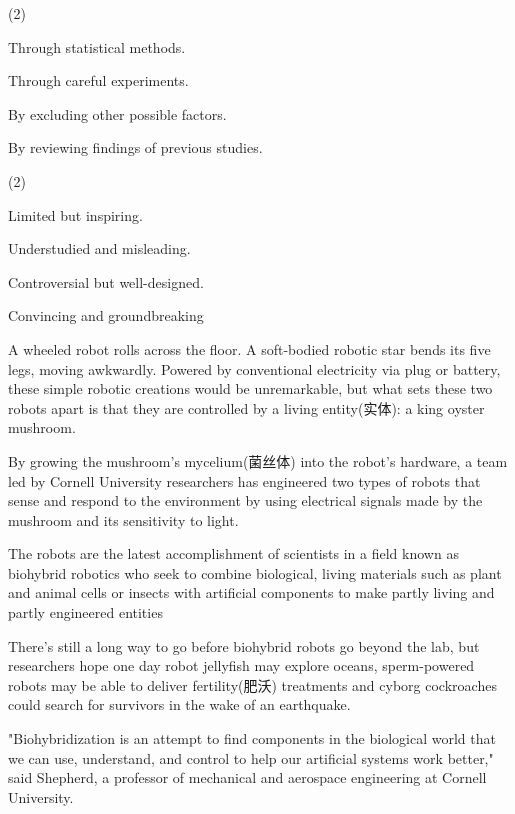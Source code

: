 \documentclass{英语试卷}
\begin{document}
\begin{choices}(2)
  \item Through statistical methods.
  \item Through careful experiments.
  \item By excluding other possible factors.
  \item By reviewing findings of previous studies.
\end{choices}
\begin{choices}(2)
  \item Limited but inspiring.
  \item Understudied and misleading.
  \item Controversial but well-designed.
  \item Convincing and groundbreaking
\end{choices}
\par A wheeled robot rolls across the floor. A soft-bodied robotic star bends its five legs, moving awkwardly. Powered by conventional electricity via plug or battery, these simple robotic creations would be unremarkable, but what sets these two robots apart is that they are controlled by a living entity(实体): a king oyster mushroom.\par
\par By growing the mushroom's mycelium(菌丝体) into the robot's hardware, a team led by Cornell University researchers has engineered two types of robots that sense and respond to the environment by using electrical signals made by the mushroom and its sensitivity to light.\par
\par The robots are the latest accomplishment of scientists in a field known as biohybrid robotics who seek to combine biological, living materials such as plant and animal cells or insects with artificial components to make partly living and partly engineered entities\par
\par There's still a long way to go before biohybrid robots go beyond the lab, but researchers hope one day robot jellyfish may explore oceans, sperm-powered robots may be able to deliver fertility(肥沃) treatments and cyborg cockroaches could search for survivors in the wake of an earthquake.\par
\par "Biohybridization is an attempt to find components in the biological world that we can use, understand, and control to help our artificial systems work better," said Shepherd, a professor of mechanical and aerospace engineering at Cornell University.\par
\end{document}
